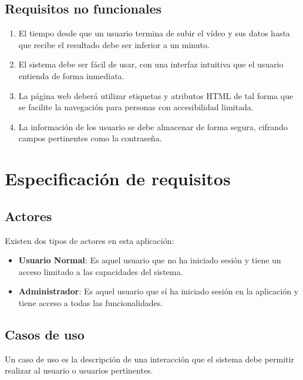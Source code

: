 \subsection{Requisitos no funcionales}

\begin{enumerate}[start=1,label={\bfseries RNF\arabic*:}]
    \item El tiempo desde que un usuario termina de subir el vídeo y sus datos
          hasta que recibe el resultado debe ser inferior a un minuto.
    \item El sistema debe ser fácil de usar, con una interfaz intuitiva que el
          usuario entienda de forma inmediata.
    \item La página web deberá utilizar etiquetas y atributos HTML de tal forma
          que se facilite la navegación para personas con accesibilidad
          limitada.
    \item La información de los usuario se debe almacenar de forma segura,
          cifrando campos pertinentes como la contraseña.
\end{enumerate}

\section{Especificación de requisitos}

\subsection{Actores}

Existen dos tipos de actores en esta aplicación:

\begin{itemize}
    \item \textbf{Usuario Normal}: Es aquel usuario que no ha iniciado sesión y
          tiene un acceso limitado a las capacidades del sistema.
    \item \textbf{Administrador}: Es aquel usuario que sí ha iniciado sesión en
          la aplicación y tiene acceso a todas las funcionalidades.
\end{itemize}

\subsection{Casos de uso}

Un caso de uso es la descripción de una interacción que el sistema debe permitir
realizar al usuario o usuarios pertinentes.


